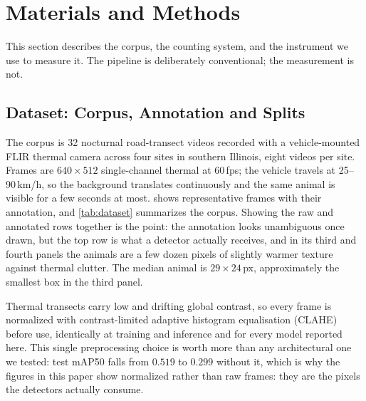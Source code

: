 \section{Materials and Methods}
\label{sec:methods}

This section describes the corpus, the counting system, and the instrument we use to
measure it. The pipeline is deliberately conventional; the measurement is not.

\subsection{Dataset: Corpus, Annotation and Splits}
\label{sec:dataset}

The corpus is 32 nocturnal road-transect videos recorded with a vehicle-mounted FLIR
thermal camera across four sites in southern Illinois, eight videos per site. Frames are
$640\times512$ single-channel thermal at 60\,fps; the vehicle travels at 25--90\,km/h, so
the background translates continuously and the same animal is visible for a few seconds at
most.  shows representative frames with their annotation, and
\cref{tab:dataset} summarizes the corpus. Showing the raw and annotated rows together is the
point: the annotation looks unambiguous once drawn, but the top row is what a detector
actually receives, and in its third and fourth panels the animals are a few dozen pixels of
slightly warmer texture against thermal clutter. The median animal is $29\times24$\,px,
approximately the smallest box in the third panel.

Thermal transects carry low and drifting global contrast, so every frame is normalized with contrast-limited adaptive histogram equalisation (CLAHE)~\cite{reza2004realization} before use, identically at training and inference and for
every model reported here. This single preprocessing choice is worth more than any architectural one we tested: test mAP50 falls from $0.519$ to $0.299$ without it, which
is why the figures in this paper show normalized rather than raw frames: they are the pixels
the detectors actually consume.

